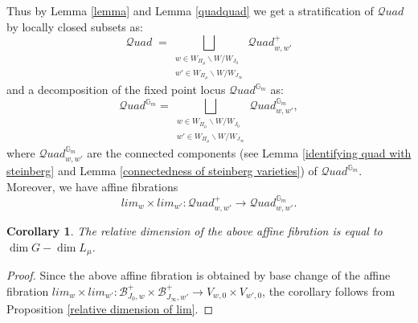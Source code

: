 \documentclass{amsart}
\newcommand{\cQuad}{\mathcal{Q}uad}
\newcommand{\gm}{\mathbb{G}_{m}}
\newcommand{\clz}{lim_{w}}
\newcommand{\cli}{lim_{w'}}
\theoremstyle{plain}
\newtheorem{corollary}{Corollary}[theorem]
\theoremstyle{definition}
\theoremstyle{remark}
\begin{document}
Thus by Lemma \ref{lemma} and Lemma \ref{quadquad} we get a stratification of $\cQuad$ by locally closed subsets as:
\begin{equation}\label{strata of quad}
\cQuad \; =\displaystyle\bigsqcup_{\substack{w\in W_{\Pi_{\mu}}\backslash W/W_{J_{0}}
\\
w'\in W_{\Pi_{\mu}}\backslash W/W_{J_{\infty}}}}\cQuad_{w,w'}^{+}
\end{equation}
and a decomposition of the fixed point locus $\cQuad^{\mathbb{G}_{m}}$ as:
\[
\cQuad^{\gm}=\displaystyle\bigsqcup_{\substack{w\in W_{\Pi_{\mu}}\backslash W/W_{J_{0}}
\\
w'\in W_{\Pi_{\mu}}\backslash W/W_{J_{\infty}}}} \cQuad_{w,w'}^{\gm},
\]     
where $\cQuad_{w,w'}^{\gm}$ are the connected components (see Lemma \ref{identifying quad with steinberg} and Lemma \ref{connectedness of steinberg varieties}) of $\cQuad^{\gm}$. Moreover, we have affine fibrations
\[
\clz\times\cli:\cQuad_{w,w'}^+\rightarrow \cQuad_{w,w'}^{\gm}.
\]
\begin{corollary}\label{bb2}
The relative dimension of the above affine fibration
is equal to $\dim G-\dim L_\mu$.
\end{corollary}
\begin{proof}
Since the above affine fibration %
is obtained by base change of the affine fibration $\clz\times\cli:\mathcal{B}_{J_{0},w}^{+}\times\mathcal{B}_{J_{\infty},w'}^{+}\rightarrow V_{w,0}\times V_{w',0}$, the corollary follows from Proposition \ref{relative dimension of lim}.
\end{proof}
\end{document}
